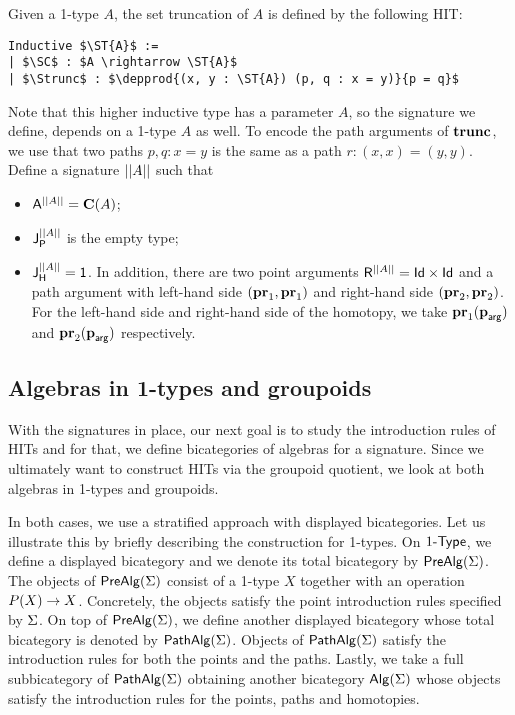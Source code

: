 \begin{example}
\label{ex:settrunc}
Given a 1-type $A$,  the set truncation of $A$ is defined by the following HIT:
\begin{lstlisting}[mathescape=true]
Inductive $\ST{A}$ :=
| $\SC$ : $A \rightarrow \ST{A}$
| $\Strunc$ : $\depprod{(x, y : \ST{A}) (p, q : x = y)}{p = q}$
\end{lstlisting}
Note that this higher inductive type has a parameter $A$,
so the signature we define, depends on a 1-type $A$ as well.
To encode the path arguments of $\Strunc$, we use that two paths $p, q : x = y$ is the same as a path $r : (x, x) = (y, y)$.
Define a signature $\ST{A}$ such that
\begin{itemize}
	\item $\pointconstr[\ST{A}] = \constantP{A}$;
	\item $\pathlabel[\ST{A}]$ is the empty type;
	\item $\homotlabel[\ST{A}] = \unit$.
	In addition, there are two point arguments $\homotpointarg[\ST{A}] = \prodP{\idP}{\idP}$
	and a path argument with left-hand side $\pair{\prle}{\prle}$ and right-hand side $\pair{\prre}{\prre}$.
	For the left-hand side and right-hand side of the homotopy, we take $\hprl{\harg}$ and $\hprr{\harg}$ respectively.
\end{itemize}
\end{example}

\subsection{Algebras in 1-types and groupoids}
With the signatures in place, our next goal is to study the introduction rules of HITs and for that, we define bicategories of algebras for a signature.
Since we ultimately want to construct HITs via the groupoid quotient, we look at both algebras in 1-types and groupoids.

In both cases, we use a stratified approach with displayed bicategories.
Let us illustrate this by briefly describing the construction for 1-types.
On $\onetypes$, we define a displayed bicategory and we denote its total bicategory by $\prealg{\sign}$.
The objects of $\prealg{\sign}$ consist of a 1-type $X$ together with an operation $\polyAct{P}{X} \rightarrow X$.
Concretely, the objects satisfy the point introduction rules specified by $\sign$.
On top of $\prealg{\sign}$, we define another displayed bicategory whose total bicategory is denoted by $\pathalg{\sign}$.
Objects of $\pathalg{\sign}$ satisfy the introduction rules for both the points and the paths.
Lastly, we take a full subbicategory of $\pathalg{\sign}$ obtaining another bicategory $\alg(\sign)$ whose objects satisfy the introduction rules for the points, paths and homotopies.

